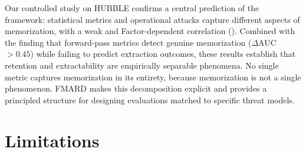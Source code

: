 \documentclass[11pt]{article}
\begin{document}
Our controlled study on HUBBLE confirms a central prediction of the framework:
statistical metrics and operational attacks capture different aspects of
memorization, with a weak and Factor-dependent correlation ().
Combined with the finding that forward-pass metrics detect genuine
memorization ($\Delta$AUC $> 0.45$) while failing to predict extraction
outcomes, these results establish that retention and extractability are
empirically separable phenomena.
No single metric captures memorization in its entirety, because memorization
is not a single phenomenon.
FMARD makes this decomposition explicit and provides a principled structure
for designing evaluations matched to specific threat models.


\section{Limitations}
\label{sec:limitations}
\end{document}

